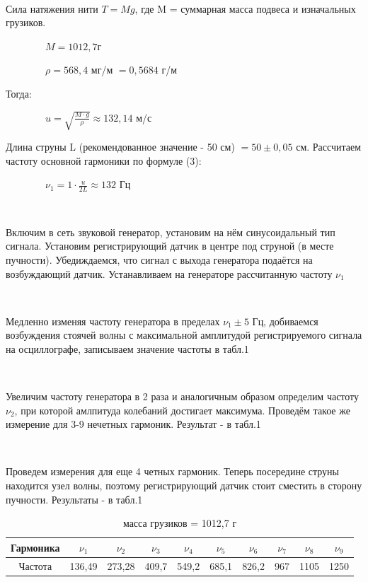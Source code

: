 \documentclass{article}
\begin{document}
\

Сила натяжения нити $T = Mg$, где M = суммарная масса подвеса и изначальных грузиков. 

\ \ \ \ \ \ \ \ $M = 1012,7$г

\ \ \ \ \ \ \ \ $\rho = 568,4$ мг/м $= 0,5684$ г/м

Тогда: 

\ \ \ \ \ \ \ \ $u = \sqrt{\frac{M\cdot g}{\rho}}\approx 132,14$ м/с

Длина струны L (рекомендованное значение - 50 см) $= 50 \pm 0,05$ см. Рассчитаем частоту основной гармоники по формуле (3):

\ \ \ \ \ \ \ \ $\nu_1 = 1\cdot\frac{u}{2L} \approx 132$ Гц

\

Включим в сеть звуковой генератор, установим на нём синусоидальный тип сигнала. Установим регистрирующий датчик в центре под струной (в месте пучности). Убедиждаемся, что сигнал с выхода генератора подаётся на возбуждающий датчик. Устанавливаем на генераторе рассчитанную частоту $\nu_1$

\

Медленно изменяя частоту генератора в пределах $\nu_1 \pm 5$ Гц, добиваемся возбуждения стоячей волны с максимальной амплитудой регистрируемого сигнала на осциллографе, записываем значение частоты в табл.1

\

Увеличим частоту генератора в 2 раза и аналогичным образом определим частоту $\nu_2$, при которой амлпитуда колебаний достигает максимума. Проведём такое же измерение для 3-9 нечетных гармоник. Результат - в табл.1

\

Проведем измерения для еще 4 четных гармоник. Теперь посередине струны находится узел волны, поэтому регистрирующий датчик стоит сместить в сторону пучности. Результаты - в табл.1

\begin{table}[h]
    \centering
    \begin{tabular}{|c|c|c|c|c|c|c|c|c|c|}
    \hline
         Гармоника & $\nu_1$ &  $\nu_2$ &  $\nu_3$ &  $\nu_4$ &  $\nu_5$ &  $\nu_6$ &  $\nu_7$ &  $\nu_8$ &  $\nu_9$ \\
    \hline
         Частота & 136,49 & 273,28 & 409,7 & 549,2 & 685,1 & 826,2 & 967 & 1105 & 1250 \\
    \hline
    \end{tabular}
    \caption{масса грузиков = 1012,7 г}
\end{table}
\end{document}
